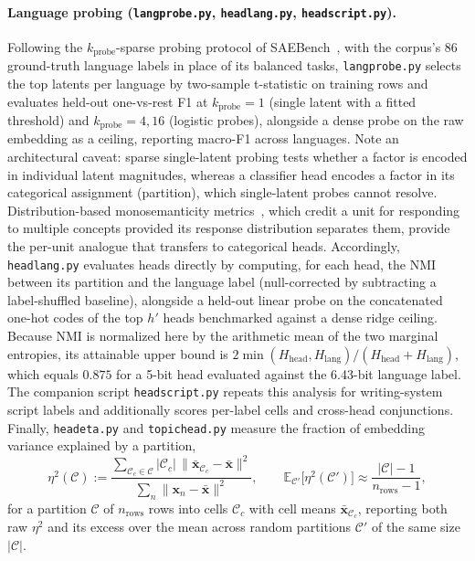 \paragraph{Language probing (\texttt{langprobe.py}, \texttt{headlang.py},
\texttt{headscript.py}).}
Following the $k_{\mathrm{probe}}$-sparse probing protocol of
SAEBench~\cite{karvonen2025}, with the corpus's 86 ground-truth language
labels in place of its balanced tasks, \texttt{langprobe.py} selects
the top latents per language by two-sample t-statistic on training rows and
evaluates held-out one-vs-rest F1 at $k_{\mathrm{probe}}{=}1$ (single
latent with a fitted threshold) and $k_{\mathrm{probe}}{=}4,16$ (logistic
probes), alongside a dense probe on the raw embedding as a ceiling,
reporting macro-F1 across languages. Note an architectural caveat: sparse
single-latent probing tests whether a factor is encoded in individual
latent magnitudes, whereas a classifier head encodes a factor in its
categorical assignment (partition), which single-latent probes cannot
resolve. Distribution-based monosemanticity
metrics~\cite{fereidouni2025evaluatingsparseautoencodersmonosemantic}, which
credit a unit for responding to multiple concepts provided its response
distribution separates them, provide the per-unit analogue that transfers
to categorical heads. Accordingly, \texttt{headlang.py} evaluates heads
directly by computing, for each head, the NMI between its partition and the
language label (null-corrected by subtracting a label-shuffled baseline),
alongside a held-out linear probe on the concatenated one-hot codes of the
top $h'$ heads benchmarked against a dense ridge ceiling. Because NMI is
normalized here by the arithmetic mean of the two marginal entropies, its
attainable upper bound is
$2\min(H_{\mathrm{head}},H_{\mathrm{lang}})/(H_{\mathrm{head}}+H_{\mathrm{lang}})$,
which equals $0.875$ for a 5-bit head evaluated against the 6.43-bit
language label. The companion script \texttt{headscript.py} repeats this
analysis for writing-system script labels and additionally scores per-label
cells and cross-head conjunctions. Finally, \texttt{headeta.py} and
\texttt{topichead.py} measure the fraction of embedding variance explained
by a partition,
\begin{equation}
	\eta^2(\mathcal{C}) := \frac{\sum_{\mathcal{C}_c \in \mathcal{C}} \lvert\mathcal{C}_c\rvert\,
	                       \lVert \bar{\mathbf{x}}_{\mathcal{C}_c} - \bar{\mathbf{x}}\rVert^2}
	                  {\sum_n \lVert \mathbf{x}_n - \bar{\mathbf{x}}\rVert^2},
	\qquad
	\mathbb{E}_{\mathcal{C}'}\big[\eta^2(\mathcal{C}')\big] \approx
	\frac{\lvert\mathcal{C}\rvert-1}{n_{\mathrm{rows}}-1},
	\label{eq:eta}
\end{equation}
for a partition $\mathcal{C}$ of $n_{\mathrm{rows}}$ rows into cells
$\mathcal{C}_c$ with cell means $\bar{\mathbf{x}}_{\mathcal{C}_c}$,
reporting both raw $\eta^2$ and its excess over the mean across random
partitions $\mathcal{C}'$ of the same size $\lvert\mathcal{C}\rvert$.

